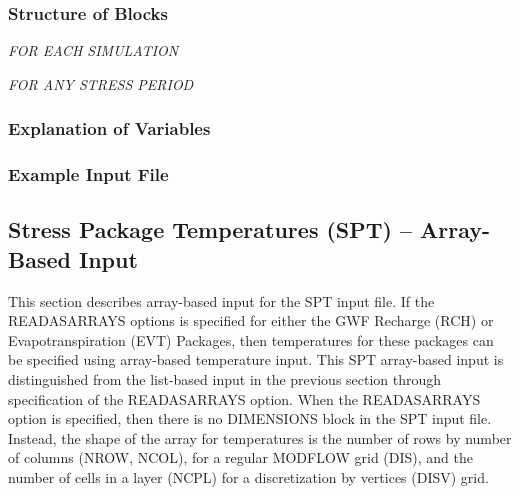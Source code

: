 \vspace{5mm}
\subsubsection{Structure of Blocks}
\vspace{5mm}

\noindent \textit{FOR EACH SIMULATION}


\vspace{5mm}
\noindent \textit{FOR ANY STRESS PERIOD}


\vspace{5mm}
\subsubsection{Explanation of Variables}
\begin{description}

\end{description}

\subsubsection{Example Input File}


\newpage
\subsection{Stress Package Temperatures (SPT) -- Array-Based Input}

This section describes array-based input for the SPT input file.  If the READASARRAYS options is specified for either the GWF Recharge (RCH) or Evapotranspiration (EVT) Packages, then temperatures for these packages can be specified using array-based temperature input.  This SPT array-based input is distinguished from the list-based input in the previous section through specification of the READASARRAYS option.  When the READASARRAYS option is specified, then there is no DIMENSIONS block in the SPT input file.  Instead, the shape of the array for temperatures is the number of rows by number of columns (NROW, NCOL), for a regular MODFLOW grid (DIS), and the number of cells in a layer (NCPL) for a discretization by vertices (DISV) grid.

\vspace{5mm}
